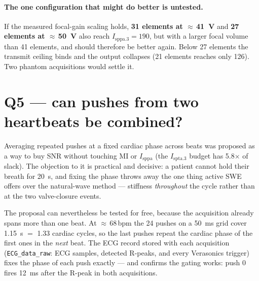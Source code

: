 \documentclass[11pt,a4paper]{article}
\begin{document}
\paragraph{The one configuration that might do better is untested.} If the measured focal-gain
scaling holds, \textbf{31 elements at $\approx$\,\SI{41}{\volt}} and \textbf{27 elements at
$\approx$\,\SI{50}{\volt}} also reach $I_\mathrm{sppa.3}=190$, but with a larger focal volume than
41 elements, and should therefore be better again. Below 27 elements the transmit ceiling binds and
the output collapses (21 elements reaches only 126). Two phantom acquisitions would settle it.

\section{Q5 --- can pushes from two heartbeats be combined?}\label{sec:crossbeat}
Averaging repeated pushes at a fixed cardiac phase across beats was proposed as a way to buy SNR
without touching MI or $I_\mathrm{sppa}$ (the $I_\mathrm{spta.3}$ budget has 5.8$\times$ of slack).
The objection to it is practical and decisive: a patient cannot hold their breath for
\SI{20}{\second}, and fixing the phase throws away the one thing active SWE offers over the
natural-wave method --- stiffness \emph{throughout} the cycle rather than at the two valve-closure
events.

The proposal can nevertheless be tested for free, because the acquisition already spans more than
one beat. At $\approx$\,68\,bpm the 24 pushes on a \SI{50}{\milli\second} grid cover
\SI{1.15}{\second} $=$ 1.33 cardiac cycles, so the last pushes repeat the cardiac phase of the
first ones in the \emph{next} beat. The ECG record stored with each acquisition
(\texttt{ECG\_data\_raw}: ECG samples, detected R-peaks, and every Verasonics trigger) fixes the
phase of each push exactly --- and confirms the gating works: push 0 fires
\SI{12}{\milli\second} after the R-peak in both acquisitions.
\end{document}
